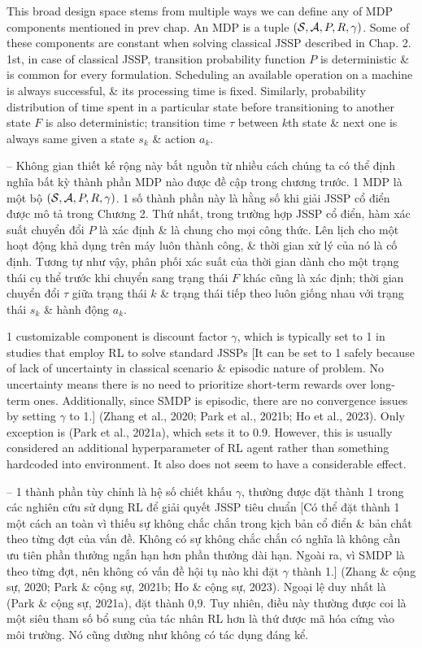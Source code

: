\documentclass{article}
\begin{document}
\begin{itemize}
    This broad design space stems from multiple ways we can define any of MDP components mentioned in prev chap. An MDP is a tuple $({\cal S},{\cal A},P,R,\gamma)$. Some of these components are constant when solving classical JSSP described in Chap. 2. 1st, in case of classical JSSP, transition probability function $P$ is deterministic \& is common for every formulation. Scheduling an available operation on a machine is always successful, \& its processing time is fixed. Similarly, probability distribution of time spent in a particular state before transitioning to another state $F$ is also deterministic; transition time $\tau$ between $k$th state \& next one is always same given a state $s_k$ \& action $a_k$.

    -- Không gian thiết kế rộng này bắt nguồn từ nhiều cách chúng ta có thể định nghĩa bất kỳ thành phần MDP nào được đề cập trong chương trước. 1 MDP là một bộ $({\cal S},{\cal A},P,R,\gamma)$. 1 số thành phần này là hằng số khi giải JSSP cổ điển được mô tả trong Chương 2. Thứ nhất, trong trường hợp JSSP cổ điển, hàm xác suất chuyển đổi $P$ là xác định \& là chung cho mọi công thức. Lên lịch cho một hoạt động khả dụng trên máy luôn thành công, \& thời gian xử lý của nó là cố định. Tương tự như vậy, phân phối xác suất của thời gian dành cho một trạng thái cụ thể trước khi chuyển sang trạng thái $F$ khác cũng là xác định; thời gian chuyển đổi $\tau$ giữa trạng thái $k$ \& trạng thái tiếp theo luôn giống nhau với trạng thái $s_k$ \& hành động $a_k$.

    1 customizable component is discount factor $\gamma$, which is typically set to 1 in studies that employ RL to solve standard JSSPs [It can be set to 1 safely because of lack of uncertainty in classical scenario \& episodic nature of problem. No uncertainty means there is no need to prioritize short-term rewards over long-term ones. Additionally, since SMDP is episodic, there are no convergence issues by setting $\gamma$ to 1.] (Zhang et al., 2020; Park et al., 2021b; Ho et al., 2023). Only exception is (Park et al., 2021a), which sets it to 0.9. However, this is usually considered an additional hyperparameter of RL agent rather than something hardcoded into environment. It also does not seem to have a considerable effect.

    -- 1 thành phần tùy chỉnh là hệ số chiết khấu $\gamma$, thường được đặt thành 1 trong các nghiên cứu sử dụng RL để giải quyết JSSP tiêu chuẩn [Có thể đặt thành 1 một cách an toàn vì thiếu sự không chắc chắn trong kịch bản cổ điển \& bản chất theo từng đợt của vấn đề. Không có sự không chắc chắn có nghĩa là không cần ưu tiên phần thưởng ngắn hạn hơn phần thưởng dài hạn. Ngoài ra, vì SMDP là theo từng đợt, nên không có vấn đề hội tụ nào khi đặt $\gamma$ thành 1.] (Zhang \& cộng sự, 2020; Park \& cộng sự, 2021b; Ho \& cộng sự, 2023). Ngoại lệ duy nhất là (Park \& cộng sự, 2021a), đặt thành 0,9. Tuy nhiên, điều này thường được coi là một siêu tham số bổ sung của tác nhân RL hơn là thứ được mã hóa cứng vào môi trường. Nó cũng dường như không có tác dụng đáng kể.


\end{itemize}
\end{document}
